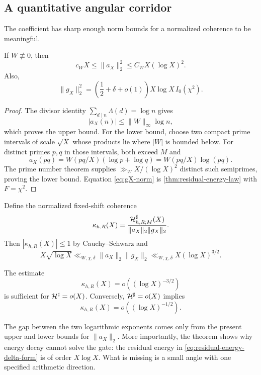 \subsection{A quantitative angular corridor}

The coefficient has sharp enough norm bounds for a normalized coherence
to be meaningful.

\begin{lemma}
\label{lem:coefficient-norm-ledger}
If $W\not\equiv0$, then
\begin{equation}
 c_WX\le\|a_X\|_2^2\le C_WX(\log X)^2.
 \label{eq:aX-norm-bounds}
\end{equation}
Also,
\begin{equation}
 \|g_X\|_2^2
 =\left(\frac12+\delta+o(1)\right)
 X\log X\,I_0(\chi^2).
 \label{eq:gX-norm}
\end{equation}
\end{lemma}

\begin{proof}
The divisor identity $\sum_{d\mid n}\Lambda(d)=\log n$ gives
\[
 |a_X(n)|\le\|W\|_\infty\log n,
\]
which proves the upper bound.  For the lower bound, choose two compact
prime intervals of scale $\sqrt X$ whose products lie where $|W|$ is
bounded below.  For distinct primes $p,q$ in those intervals, both exceed
$M$ and
\[
 a_X(pq)=W(pq/X)(\log p+\log q)=W(pq/X)\log(pq).
\]
The prime number theorem supplies $\gg_WX/(\log X)^2$ distinct such
semiprimes, proving the lower bound.  Equation \eqref{eq:gX-norm} is
\cref{thm:residual-energy-law} with $F=\chi^2$.
\end{proof}

Define the normalized fixed-shift coherence
\begin{equation}
 \kappa_{h,R}(X)=
 \frac{\mathcal H^\sharp_{h,R;M}(X)}
 {\|a_X\|_2\|g_X\|_2}.
 \label{eq:normalized-coherence}
\end{equation}
Then $|\kappa_{h,R}(X)|\le1$ by Cauchy--Schwarz and
\begin{equation}
 X\sqrt{\log X}
 \ll_{W,\chi,\delta}\|a_X\|_2\|g_X\|_2
 \ll_{W,\chi,\delta}X(\log X)^{3/2}.
 \label{eq:norm-product-corridor}
\end{equation}

\begin{corollary}
\label{cor:angular-corridor}
The estimate
\begin{equation}
 \kappa_{h,R}(X)=o((\log X)^{-3/2})
 \label{eq:angular-sufficient}
\end{equation}
is sufficient for $\mathcal H^\sharp=o(X)$.  Conversely,
$\mathcal H^\sharp=o(X)$ implies
\begin{equation}
 \kappa_{h,R}(X)=o((\log X)^{-1/2}).
 \label{eq:angular-necessary}
\end{equation}
\end{corollary}

The gap between the two logarithmic exponents comes only from the present
upper and lower bounds for $\|a_X\|_2$.  More importantly, the theorem
shows why energy decay cannot solve the gate: the residual energy in
\eqref{eq:residual-energy-delta-form} is of order $X\log X$.  What is
missing is a small angle with one specified arithmetic direction.
